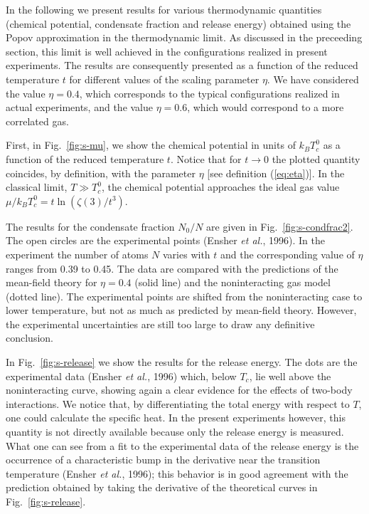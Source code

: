 In the following we present  results for various thermodynamic
quantities (chemical potential, condensate fraction and release
energy) obtained using the Popov approximation in the thermodynamic
limit.  As discussed in the preceeding section, this limit is well
achieved   in the configurations realized in present experiments.
The results  are consequently presented as a function of the reduced
temperature  $t$ for different values of the scaling parameter $\eta$. We
have considered  the value $\eta=0.4$, which corresponds to the typical
configurations  realized in actual experiments, and the value $\eta=0.6$,
which would  correspond to a more correlated gas.

First, in Fig.~\ref{fig:s-mu}, we show the chemical potential in units
of $k_BT_c^0$ as a function of the reduced temperature $t$. Notice that 
for  $t\to 0$ the plotted quantity coincides, by definition,
with the  parameter $\eta$ [see definition (\ref{eq:eta})].  In the
classical limit, $T\gg T_c^0$, the chemical potential approaches the
ideal gas value  $\mu/k_BT_c^0 = t\ln (\zeta(3)/t^3)$.

The results for the condensate fraction $N_0/N$ are given in 
Fig.~\ref{fig:s-condfrac2}. The open circles are the experimental 
points (Ensher {\it et al.}, 1996). In the experiment the number of 
atoms $N$ varies with $t$ and the corresponding value of $\eta$ ranges 
from 0.39 to 0.45.  The data are compared with the predictions of the 
mean-field theory for $\eta=0.4$ (solid line) and the noninteracting gas 
model (dotted line). The experimental points are shifted from the
noninteracting case to lower temperature, but not as much as predicted by 
mean-field theory. However, the experimental uncertainties are 
still too large to draw any definitive conclusion. 

In Fig.~\ref{fig:s-release} we show the results for the release energy. 
The dots are the experimental data (Ensher {\it et al.}, 1996) which, 
below $T_c$, lie well above the noninteracting curve, showing again 
a clear evidence for the effects of two-body interactions. We notice 
that, by differentiating the total energy with respect to $T$, one 
could calculate the specific heat. In the present experiments however, 
this quantity  is not directly available because only the release 
energy is measured.  What one can see from a fit to the experimental 
data of the release energy is the occurrence of a characteristic  
bump in the derivative near the transition temperature  (Ensher 
{\it et al.}, 1996); this behavior is in good agreement with the 
prediction obtained by taking the derivative of the theoretical 
curves in Fig.~\ref{fig:s-release}.

